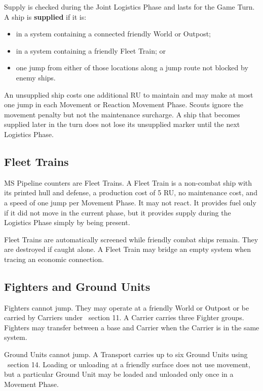 Supply is checked during the Joint Logistics Phase and lasts for the Game
Turn. A ship is \textbf{supplied} if it is:

\begin{itemize}
  \item in a system containing a connected friendly World or Outpost;
  \item in a system containing a friendly Fleet Train; or
  \item one jump from either of those locations along a jump route not blocked
    by enemy ships.
\end{itemize}

An unsupplied ship costs one additional RU to maintain and may make at most one
jump in each Movement or Reaction Movement Phase. Scouts ignore the movement
penalty but not the maintenance surcharge. A ship that becomes supplied later
in the turn does not lose its unsupplied marker until the next Logistics Phase.

\subsection{Fleet Trains}

MS Pipeline counters are Fleet Trains. A Fleet Train is a non-combat ship with
its printed hull and defense, a production cost of 5 RU, no maintenance cost,
and a speed of one jump per Movement Phase. It may not react. It provides fuel
only if it did not move in the current phase, but it provides supply during the
Logistics Phase simply by being present.

Fleet Trains are automatically screened while friendly combat ships remain.
They are destroyed if caught alone. A Fleet Train may bridge an empty system
when tracing an economic connection.

\subsection{Fighters and Ground Units}

Fighters cannot jump. They may operate at a friendly World or Outpost or be
carried by Carriers under \SpaceEmpires\ section 11. A Carrier carries three
Fighter groups. Fighters may transfer between a base and Carrier when the
Carrier is in the same system.

Ground Units cannot jump. A Transport carries up to six Ground Units using
\CloseEncounters\ section 14. Loading or unloading at a friendly surface does
not use movement, but a particular Ground Unit may be loaded and unloaded only
once in a Movement Phase.

